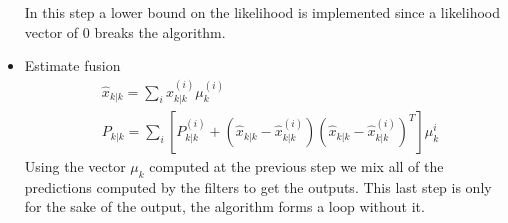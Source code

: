 \documentclass[twocolumn]{article}
\begin{document}
\begin{itemize}
           In this step a lower bound on the likelihood is implemented since a likelihood vector of $0$ breaks the algorithm.
    \item Estimate fusion
          \begin{align*}
               & \hat{x}_{k|k}=\sum_{i}x^{(i)}_{k|k}\mu^{(i)}_{k}                                                                      \\
               & P_{k|k}=\sum_{i}[P^{(i)}_{k|k}+(\hat{x}_{k|k}-\hat{x}^{(i)}_{k|k})(\hat{x}_{k|k}-\hat{x}^{(i)}_{k|k})^{T}]\mu_{k}^{i}
          \end{align*}
          Using the vector $\mu_{k}$ computed at the previous step we mix all of the predictions computed by the filters to get 
          the outputs. This last step is only for the sake of the output, the algorithm forms a loop without it.
\end{itemize}
\end{document}
